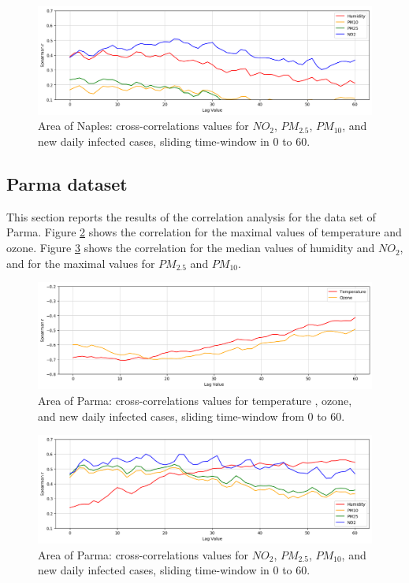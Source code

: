 \documentclass[review]{elsarticle}
\begin{document}
 \begin{figure}[htp]	\centering	\includegraphics[width=1\linewidth]{img/corr_pm_naples.png}	\caption{Area of Naples: cross-correlations values for $NO_{2}$, $PM_{2.5}$, $PM_{10}$, and new daily infected cases, sliding time-window in $0$ to $60$.}	\label{fig:corr_pm_naples} \end{figure}
\newpage \subsection{Parma dataset}
This section reports the results of the correlation analysis for the data set of Parma. 		Figure \ref{fig:corr_parma} shows the correlation for the maximal values of temperature 
 and ozone.
	Figure \ref{fig:corr_pm_parma} shows the correlation for the median values of humidity and $NO_{2}$, and for the 		maximal values for $PM_{2.5}$ and $PM_{10}$.
\begin{figure}[htp] 	\centering 	\includegraphics[width=1\linewidth]{img/corr_temp_parma.png} 	\caption{Area of Parma: cross-correlations values for temperature 
, ozone, 
 and new daily infected cases, sliding time-window from $0$ to $60$.} 	\label{fig:corr_parma} \end{figure} 
 \begin{figure}[htp]	\centering	\includegraphics[width=1\linewidth]{img/corr_pm_parma.png}	\caption{Area of Parma: cross-correlations values for $NO_{2}$, $PM_{2.5}$, $PM_{10}$, and new daily infected cases, sliding time-window in $0$ to $60$.}	\label{fig:corr_pm_parma} \end{figure}
\end{document}
